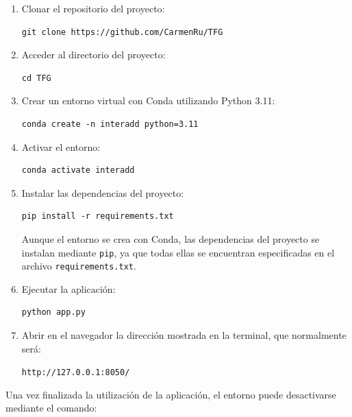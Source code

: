 \begin{enumerate}
    \item Clonar el repositorio del proyecto:

\begin{verbatim}
git clone https://github.com/CarmenRu/TFG
\end{verbatim}

    \item Acceder al directorio del proyecto:

\begin{verbatim}
cd TFG
\end{verbatim}

    \item Crear un entorno virtual con Conda utilizando Python 3.11:

\begin{verbatim}
conda create -n interadd python=3.11
\end{verbatim}

    \item Activar el entorno:

\begin{verbatim}
conda activate interadd
\end{verbatim}

    \item Instalar las dependencias del proyecto:

\begin{verbatim}
pip install -r requirements.txt
\end{verbatim}

    Aunque el entorno se crea con Conda, las dependencias del proyecto se instalan mediante \texttt{pip}, ya que todas ellas se encuentran especificadas en el archivo \texttt{requirements.txt}.

    \item Ejecutar la aplicación:

\begin{verbatim}
python app.py
\end{verbatim}

    \item Abrir en el navegador la dirección mostrada en la terminal, que normalmente será:

\begin{center}
\texttt{http://127.0.0.1:8050/}
\end{center}

\end{enumerate}

Una vez finalizada la utilización de la aplicación, el entorno puede desactivarse mediante el comando:

